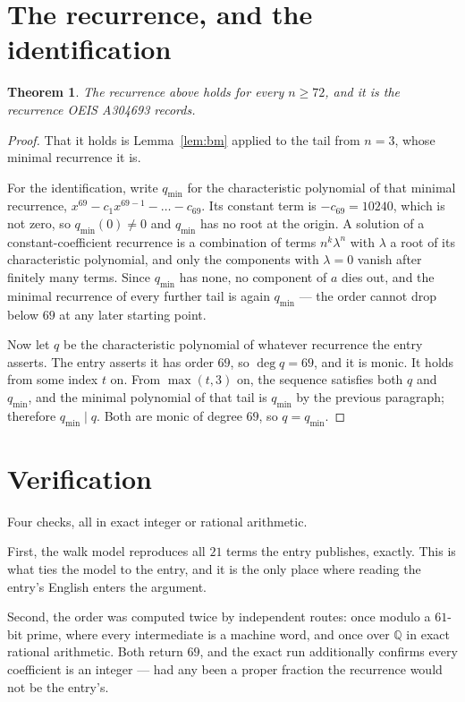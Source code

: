 \documentclass[11pt,a4paper]{article}
\theoremstyle{plain}
\newtheorem{theorem}{Theorem}
\theoremstyle{definition}
\begin{document}
\section{The recurrence, and the identification}

\begin{theorem}
The recurrence above holds for every $n\ge72$, and it is the recurrence OEIS A304693 records.
\end{theorem}

\begin{proof}
That it holds is Lemma~\ref{lem:bm} applied to the tail from $n=3$, whose minimal
recurrence it is.

For the identification, write $q_{\min}$ for the characteristic polynomial of that minimal
recurrence, $x^{69}-c_1x^{69-1}-\dots-c_{69}$. Its constant term is
$-c_{69}=10240$, which is not zero, so $q_{\min}(0)\neq0$ and $q_{\min}$ has no
root at the origin. A solution of a constant-coefficient recurrence is a combination of terms
$n^{k}\lambda^{n}$ with $\lambda$ a root of its characteristic polynomial, and only the
components with $\lambda=0$ vanish after finitely many terms. Since $q_{\min}$ has none, no
component of $a$ dies out, and the minimal recurrence of every further tail is again
$q_{\min}$ --- the order cannot drop below $69$ at any later starting point.

Now let $q$ be the characteristic polynomial of whatever recurrence the entry asserts. The
entry asserts it has order $69$, so $\deg q=69$, and it is monic. It holds from some
index $t$ on. From $\max(t,3)$ on, the sequence satisfies both $q$ and $q_{\min}$, and
the minimal polynomial of that tail is $q_{\min}$ by the previous paragraph; therefore
$q_{\min}\mid q$. Both are monic of degree $69$, so $q=q_{\min}$.
\end{proof}

\section{Verification}

Four checks, all in exact integer or rational arithmetic.

First, the walk model reproduces all $21$ terms the entry publishes, exactly. This is
what ties the model to the entry, and it is the only place where reading the entry's English
enters the argument.

Second, the order was computed twice by independent routes: once modulo a $61$-bit prime, where
every intermediate is a machine word, and once over $\mathbb{Q}$ in exact rational arithmetic.
Both return $69$, and the exact run additionally confirms every coefficient is an integer
--- had any been a proper fraction the recurrence would not be the entry's.
\end{document}

